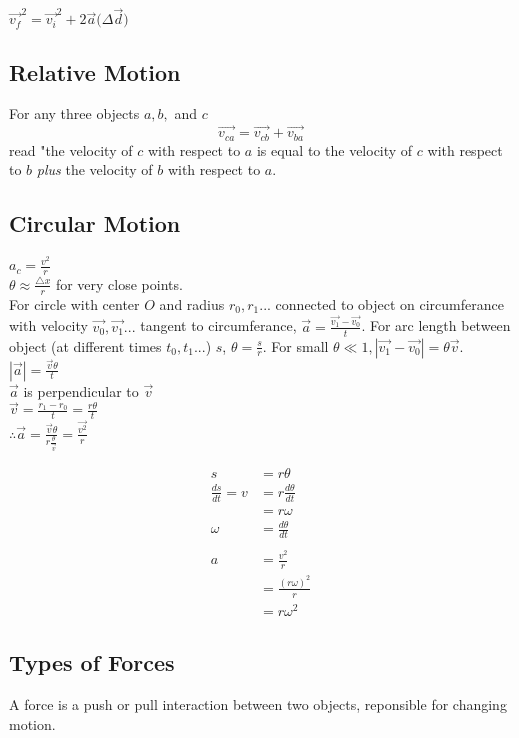 \documentclass[12pt]{article}
\begin{document}
$\vec{v_f}^2 = \vec{v_i}^2 + 2\vec{a}\bigl(\Delta\vec{d}\bigl)$

\subsection*{Relative Motion}
For any three objects $a, b,$ and $c$ \[ \vec{v_{ca}} = \vec{v_{cb}} + \vec{v_{ba}} \] read "the velocity of $c$ with respect to $a$ is equal to the velocity of $c$ with respect to $b$ \emph{plus} the velocity of $b$ with respect to $a$.

\subsection*{Circular Motion}
$a_c = \frac{v^2}{r}$\\
$\theta \approx \frac{\bigtriangleup x}{r}$ for very close points.\\
For circle with center $O$ and radius $r_0, r_1...$ connected to object on circumferance with velocity $\vec{v_0}, \vec{v_1}...$ tangent to circumferance, $\vec{a} = \frac{\vec{v_1} - \vec{v_0}}{t}$. For arc length between object (at different times $t_0, t_1...$) $s$, $\theta = \frac{s}{r}$. For small $\theta \ll 1, |\vec{v_1} - \vec{v_0}| = \theta\vec{v}.$\\
$|\vec{a}| = \frac{\vec{v}\theta}{t}$\\
$\vec{a}$ is perpendicular to $\vec{v}$\\
$\vec{v} = \frac{r_1-r_0}{t} = \frac{r\theta}{t}$\\
$\therefore \vec{a} = \frac{\vec{v}\theta}{r\frac{\theta}{\vec{v}}} = \frac{\vec{v^2}}{r}$

\begin{align*}
s &= r\theta\\
\frac{ds}{dt} = v &= r\frac{d\theta}{dt}\\
&= r\omega\\
\omega &= \frac{d\theta}{dt}\\\\
a &= \frac{v^2}{r}\\
&= \frac{(r\omega)^2}{r}\\
&= r\omega ^2
\end{align*}

\subsection*{Types of Forces}
A force is a push or pull interaction between two objects, reponsible for changing motion.
\end{document}
